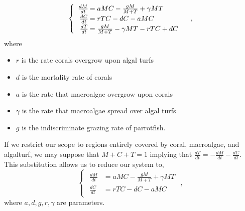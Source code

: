 \begin{frame}
$$\begin{cases}\begin{array}{rl}
\frac{dM}{dt}\hspace{-.8em}&=aMC - \frac{gM}{M+T}+\gamma M T\\
\frac{dC}{dt}\hspace{-.8em}&=rTC - dC - aMC\\
\frac{dT}{dt}\hspace{-.8em}&=\frac{gM}{M + T} - \gamma MT - rTC + dC
\end{array}\end{cases},$$ where \begin{itemize}\itemsep0pt
\item $r$ is the rate corals overgrow upon algal turfs\\
\item $d$ is the mortality rate of corals\\
\item $a$ is the rate that macroalgae overgrow upon corals\\
\item $\gamma$ is the rate that macroalgae spread over algal turfs\\
\item $g$ is the indiscriminate grazing rate of parrotfish.
\end{itemize}
\end{frame}

\begin{frame}
If we restrict our scope to regions entirely covered by coral, macroalgae, and algalturf, we may suppose that $M+C+T=1$ implying that  $\frac{dT}{dt}=-\frac{dM}{dt}-\frac{dC}{dt}$. This substitution allows us to  reduce our system to, $$\begin{cases} 
\begin{array}{rl}
\frac{dM}{dt}&= aMC-\frac{gM}{M+T} + \gamma MT\\ 
\frac{dC}{dt}&=rTC-dC-aMC
\end{array} \end{cases},$$ where $a,d,g,r,\gamma$ are parameters.
\end{frame}

